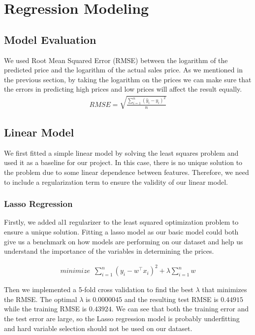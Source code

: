 \documentclass[twocolumn]{article}
\begin{document}
\section{Regression Modeling}
\subsection{Model Evaluation}
We used Root Mean Squared Error (RMSE) between the logarithm of the predicted price and the logarithm of the actual sales price. As we mentioned in the previous section, by taking the logarithm on the prices we can make sure that the errors in predicting high prices and low prices will affect the result equally.
\begin{align}  
    \displaystyle{RMSE = \sqrt{\frac {\sum_{i = 1}^{n}(\hat{y}_{i} - y_{i})^2}{n}}}
\end{align}
\subsection{Linear Model}
We first fitted a simple linear model by solving the least squares problem and used it as a baseline for our project. In this case, there is no unique solution to the problem due to some linear dependence between features. Therefore, we need to include a regularization term to ensure the validity of our linear model.

\subsubsection{Lasso Regression}
Firstly, we added al1 regularizer to the least squared optimization problem to ensure a unique solution. Fitting a lasso model as our basic model could both give us a benchmark on how models are performing on our dataset and help us understand the importance of the variables in determining the prices. 

\begin{align}  
    \displaystyle{minimize \enspace \sum\limits_{i=1}^{n}(y_i - w^\intercal x_i)^2 + \lambda \sum\limits_{i=1}^{n} w}
\end{align}

Then we implemented a 5-fold cross validation to find the best $\lambda$ that minimizes the RMSE. The optimal $\lambda$ is $0.0000045$ and the resulting test RMSE is $0.44915$ while the training RMSE is $0.43924$. We can see that both the training error and the test error are large, so the Lasso regression model is probably underfitting and hard variable selection should not be used on our dataset. 
\end{document}
